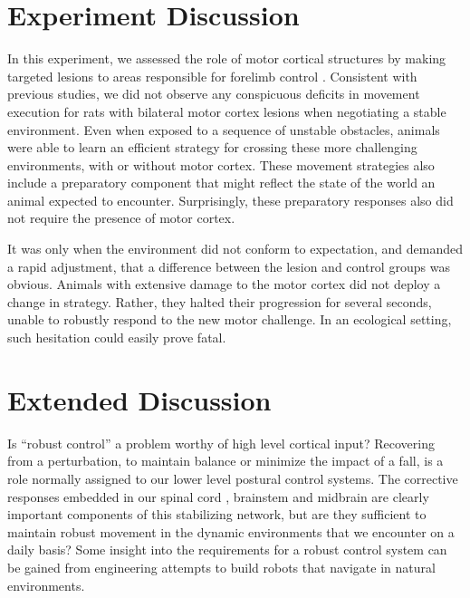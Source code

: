 \section{Experiment Discussion}

In this experiment, we assessed the role of motor cortical structures by making targeted lesions to areas responsible for forelimb control \cite{Kawai2015,Otchy2015}. Consistent with previous studies, we did not observe any conspicuous deficits in movement execution for rats with bilateral motor cortex lesions when negotiating a stable environment. Even when exposed to a sequence of unstable obstacles, animals were able to learn an efficient strategy for crossing these more challenging environments, with or without motor cortex. These movement strategies also include a preparatory component that might reflect the state of the world an animal expected to encounter. Surprisingly, these preparatory responses also did not require the presence of motor cortex.

It was only when the environment did not conform to expectation, and demanded a rapid adjustment, that a difference between the lesion and control groups was obvious. Animals with extensive damage to the motor cortex did not deploy a change in strategy. Rather, they halted their progression for several seconds, unable to robustly respond to the new motor challenge. In an ecological setting, such hesitation could easily prove fatal.

\section{Extended Discussion}

Is ``robust control'' a problem worthy of high level cortical input? Recovering from a perturbation, to maintain balance or minimize the impact of a fall, is a role normally assigned to our lower level postural control systems. The corrective responses embedded in our spinal cord \cite{Sherrington1893b,Sherrington1910}, brainstem \cite{Arshian2014} and midbrain \cite{Grillner1973} are clearly important components of this stabilizing network, but are they sufficient to maintain robust movement in the dynamic environments that we encounter on a daily basis? Some insight into the requirements for a robust control system can be gained from engineering attempts to build robots that navigate in natural environments.

